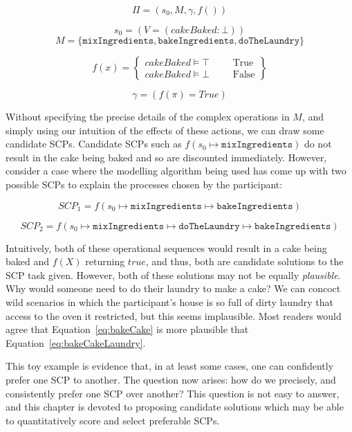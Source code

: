 \documentclass[
11pt, %
english, %
singlespacing, %
headsepline, %
]{MastersDoctoralThesis} %
\begin{document}
\[
\Pi = (s_0, M, \gamma, f())
\]

\[
s_0 = (V=(cakeBaked: \bot) )
\]
\[
M=\{\texttt{mixIngredients}, \texttt{bakeIngredients}, \texttt{doTheLaundry}\}
\]

\[
f(x)= \left\{ \begin{split} cakeBaked \models \top & & & \textrm{True}\\ cakeBaked \models \bot & & & \textrm{False} \end{split} \right\}
\]

\[
\gamma = (f(\pi) = True)
\]

Without specifying the precise details of the complex operations in $M$, and simply using our intuition of the effects of these actions, we can draw some candidate SCPs. Candidate SCPs such as $f(s_0 \longmapsto \texttt{mixIngredients})$ do not result in the cake being baked and so are discounted immediately. However, consider a case where the modelling algorithm being used has come up with two possible SCPs to explain the processes chosen by the participant:

\begin{equation} \label{eq:bakeCake}
SCP_1 = f(s_0\longmapsto \texttt{mixIngredients} \longmapsto \texttt{bakeIngredients})
\end{equation}

\begin{equation} \label{eq:bakeCakeLaundry}
SCP_2 = f(s_0 \longmapsto \texttt{mixIngredients} \longmapsto  \texttt{doTheLaundry} \longmapsto \texttt{bakeIngredients})
\end{equation}

Intuitively, both of these operational sequences would result in a cake being baked and $f(X)$ returning $true$, and thus, both are candidate solutions to the SCP task given. However, both of these solutions may not be equally \textit{plausible}. Why would someone need to do their laundry to make a cake? We can concoct wild scenarios in which the participant's house is so full of dirty laundry that access to the oven it restricted, but this seems implausible. Most readers would agree that Equation~\ref{eq:bakeCake} is more plausible that Equation~\ref{eq:bakeCakeLaundry}.

This toy example is evidence that, in at least some cases, one can confidently prefer one SCP to another. The question now arises: how do we precisely, and consistently prefer one SCP over another? This question is not easy to answer, and this chapter is devoted to proposing candidate solutions which may be able to quantitatively score and select preferable SCPs.
\end{document}
